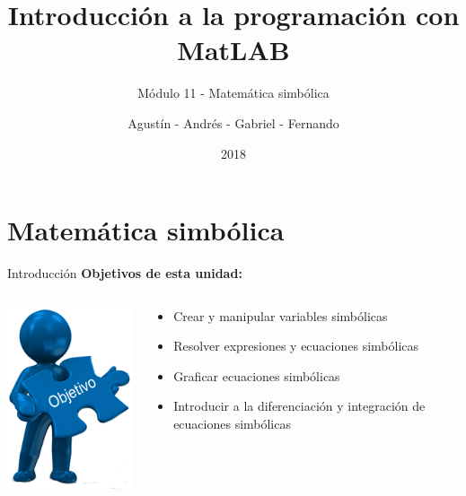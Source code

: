 \documentclass{bredelebeamer}
\title[Programación en MatLAB]{Introducción a la programación con MatLAB}
\subtitle{Módulo 11 - Matemática simbólica}
\author{Agustín - Andrés - Gabriel - Fernando\inst{1}}
\institute[UTN.BA]
{
  \inst{1}%
  Universidad Tecnológica Nacional\\
  Facultad Regional Buenos Aires
  }
\date{2018}
\begin{document}
\begin{frame}
  \titlepage 
\end{frame}



\section{Matemática simbólica}

\begin{frame}{Introducción}
\textbf{Objetivos de esta unidad:}




\begin{columns}
\begin{column}{0.35\textwidth}
\begin{center}
\includegraphics[scale=0.4]{images/img40.png}
\end{center}
\end{column}
\begin{column}{0.8\textwidth}
\begin{center}
\begin{itemize}
\item Crear y manipular variables simbólicas
\item Resolver expresiones y ecuaciones simbólicas
\item Graficar ecuaciones simbólicas
\item Introducir a la diferenciación y integración de ecuaciones simbólicas
\end{itemize}
\end{center}
\end{column}
\end{columns}




\end{frame}
\end{document}
